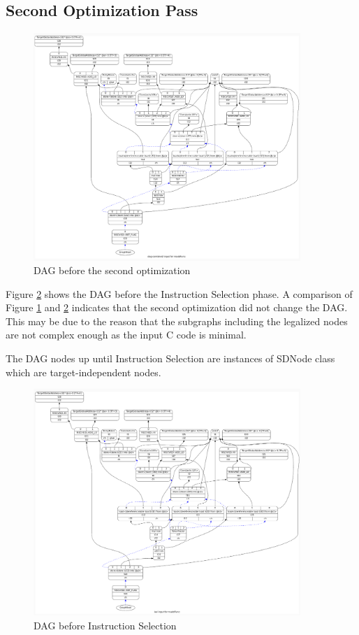 \subsection{Second Optimization Pass}
\begin{figure}
    \centering
    \includegraphics[width=0.9\textwidth]{path_instruction/madd_dag_combine2.png}
    \caption{DAG before the second optimization}
    \label{fig:combine2}
\end{figure}

Figure \ref{fig:isel} shows the DAG before the Instruction Selection phase. A comparison of Figure \ref{fig:combine2} and \ref{fig:isel} indicates that the second optimization did not change the DAG. This may be due to the reason that the subgraphs including the legalized nodes are not complex enough as the input C code is minimal.
\par
The DAG nodes up until Instruction Selection are instances of SDNode class which are target-independent nodes.
\begin{figure}
    \centering
    \includegraphics[width=0.9\textwidth]{path_instruction/madd_dag_isel.png}
    \caption{DAG before Instruction Selection}
    \label{fig:isel}
\end{figure}

